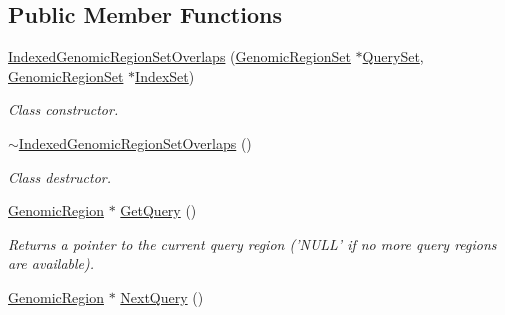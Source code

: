 \subsection*{Public Member Functions}
\begin{CompactItemize}
\item 
\hyperlink{classIndexedGenomicRegionSetOverlaps_54b230481fa7970eaf8c04efc8734f9e}{IndexedGenomicRegionSetOverlaps} (\hyperlink{classGenomicRegionSet}{GenomicRegionSet} $\ast$\hyperlink{classGenomicRegionSetOverlaps_e513304379055f6d379bc5907733dbe2}{QuerySet}, \hyperlink{classGenomicRegionSet}{GenomicRegionSet} $\ast$\hyperlink{classGenomicRegionSetOverlaps_c587bf854c827381493735b473622e03}{IndexSet})
\begin{CompactList}\small\item\em Class constructor. \item\end{CompactList}\item 
\hypertarget{classIndexedGenomicRegionSetOverlaps_a76b1a90365b5b4997288806e5374e92}{
\hyperlink{classIndexedGenomicRegionSetOverlaps_a76b1a90365b5b4997288806e5374e92}{$\sim$IndexedGenomicRegionSetOverlaps} ()}
\label{classIndexedGenomicRegionSetOverlaps_a76b1a90365b5b4997288806e5374e92}

\begin{CompactList}\small\item\em Class destructor. \item\end{CompactList}\item 
\hypertarget{classIndexedGenomicRegionSetOverlaps_073ad4ed7841cd9d3ad7055d39a75310}{
\hyperlink{classGenomicRegion}{GenomicRegion} $\ast$ \hyperlink{classIndexedGenomicRegionSetOverlaps_073ad4ed7841cd9d3ad7055d39a75310}{GetQuery} ()}
\label{classIndexedGenomicRegionSetOverlaps_073ad4ed7841cd9d3ad7055d39a75310}

\begin{CompactList}\small\item\em Returns a pointer to the current query region ('NULL' if no more query regions are available). \item\end{CompactList}\item 
\hypertarget{classIndexedGenomicRegionSetOverlaps_e5f114ad5f48ed13feedef3d4e3a9ab1}{
\hyperlink{classGenomicRegion}{GenomicRegion} $\ast$ \hyperlink{classIndexedGenomicRegionSetOverlaps_e5f114ad5f48ed13feedef3d4e3a9ab1}{NextQuery} ()}
\label{classIndexedGenomicRegionSetOverlaps_e5f114ad5f48ed13feedef3d4e3a9ab1}


\end{CompactItemize}
